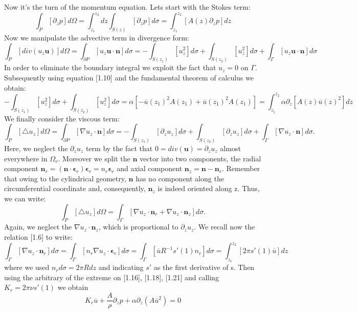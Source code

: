 \documentclass[a4paper]{report}
\begin{document}
Now it's the turn of the momentum equation. Lets start with the Stokes term:
	\begin{equation}
	\int_{P}[\partial_{z}p]d\Omega=\int_{z_1}^{z_2}dz\int_{S(z)}	[\partial_z p] d\sigma=\int_{z_1}^{z_2} [A(z) \partial_z p]dz
	\end{equation}
Now we manipulate the advective term in divergence form:
	\begin{equation}
	\int_P [div(u_z \mathbf{u})]d\Omega =	\int_{\partial P} [u_z \mathbf{u} \cdot \mathbf{n}]d\sigma = -\int_{S(z_1)} [u_z^2]d\sigma + \int_{S(z_2)}[u_z^2]d\sigma + \int_{\Gamma} [u_z \mathbf{u} \cdot \mathbf{n}]d\sigma
	\end{equation}
In order to eliminate the boundary integral we exploit the fact that $u_z=0 $ on $\Gamma$. Subsequently using equation [1.10] and the fundamental theorem of calculus we obtain:
	\begin{equation}
	-\int_{S(z_1)}[u_z^2]d\sigma+\int_{S(z_2)}[u_z^2]d\sigma = \alpha[-\overline{u}(z_1)^2 A(z_1)+\overline{u}(z_1)^2 A(z_1)]=\int_{z_1}^{z_2}\alpha \partial_z[A(z)\overline{u}(z)^2]dz
	\end{equation}
We finally consider the viscous term:
	\begin{equation}
		\int_P [\triangle u_z]d\Omega = \int_{\partial P}[\nabla u_z \cdot \mathbf{n}]d\sigma =-\int_{S(z_1)}[\partial_z u_z]d\sigma+\int_{S(z_2)}[\partial_z u_z]d\sigma+\int_{\Gamma}[\nabla u_z \cdot \mathbf{n}]d\sigma.
	\end{equation}
Here, we neglect the $ \partial_z u_z $ term by the fact that $ 0=div(\mathbf{u})=\partial_z u_z$ almost everywhere in $\Omega_v$. Moreover we split the $\mathbf{n}$ vector into two components, the radial component $\mathbf{n}_r=(\mathbf{n} \cdot \boldsymbol{\epsilon}_r)\boldsymbol{\epsilon}_r =n_r \boldsymbol{\epsilon}_r$ and axial component $\mathbf{n}_z= \mathbf{n}-\mathbf{n}_r$. Remember that owing to the cylindrical geometry, $\mathbf{n}$ has no component along the circumferential coordinate and, consequently, $\mathbf{n}_z$ is indeed oriented along z. Thus, we can write:
\begin{equation}
\int_P [\triangle u_z] d\Omega= \int_{\Gamma}[\nabla u_z \cdot \mathbf{n}_r+\nabla u_z \cdot \mathbf{n}_z]d\sigma.
\end{equation}
Again, we neglect the $\nabla u_z \cdot \mathbf{n}_z$, which is proportional to $\partial_{z} u_z $. We recall now the relation [1.6] to write:
\begin{equation}
\int_{\Gamma} [\nabla u_z \cdot \mathbf{n}_r]d\sigma = \int_{\Gamma}[n_r \nabla u_z \cdot \boldsymbol{\epsilon}_r]d\sigma=\int_{\Gamma}[\overline{u} R^{-1}s'(1) n_r]d\sigma = \int_{z_1}^{z_2}[2\pi s'(1)  \overline{u}]dz
\end{equation}
where we used $n_r d\sigma= 2\pi R dz$ and indicating $s'$ as the first derivative of s.
Then using the arbitrary of the extreme on [1.16], [1.18], [1.21] and calling $K_r= 2\pi \nu s'(1)$ we obtain
\begin{equation}
K_r \overline{u}+ \frac{A}{\rho} \partial_{z} p + \alpha \partial_z (A \overline{u}^2)=0
\end{equation}
\end{document}
